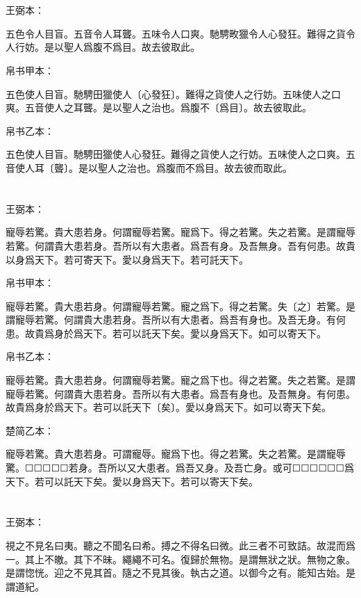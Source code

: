 \documentclass[a5paper]{ctexbook}
\begin{document}
    \chapter{}
    王弼本：

    五色令人目盲。五音令人耳聾。五味令人口爽。馳騁畋獵令人心發狂。難得之貨令人行妨。是以聖人爲腹不爲目。故去彼取此。

    
    帛书甲本：

    五色使人目盲。馳騁田獵使人〔心發狂〕。難得之貨使人之行妨。五味使人之口爽。五音使人之耳聾。是以聖人之治也。爲腹不〔爲目〕。故去彼取此。

    帛书乙本：

    五色使人目盲。馳騁田獵使人心發狂。難得之貨使人之行妨。五味使人之口爽。五音使人耳〔聾〕。是以聖人之治也。爲腹而不爲目。故去彼而取此。

    \chapter{}
    王弼本：

    寵辱若驚。貴大患若身。何謂寵辱若驚。寵爲下。得之若驚。失之若驚。是謂寵辱若驚。何謂貴大患若身。吾所以有大患者。爲吾有身。及吾無身。吾有何患。故貴以身爲天下。若可寄天下。愛以身爲天下。若可託天下。

    
    帛书甲本：

    寵辱若驚。貴大患若身。何謂寵辱若驚。寵之爲下。得之若驚。失〔之〕若驚。是謂寵辱若驚。何謂貴大患若身。吾所以有大患者。爲吾有身也。及吾无身。有何患。故貴爲身於爲天下。若可以託天下矣。愛以身爲天下。如可以寄天下。

    帛书乙本：

    寵辱若驚。貴大患若身。何謂寵辱若驚。寵之爲下也。得之若驚。失之若驚。是謂寵辱若驚。何謂貴大患若身。吾所以有大患者。爲吾有身也。及吾無身。有何患。故貴爲身於爲天下。若可以託天下〔矣〕。愛以身爲天下。如可以寄天下矣。

    楚简乙本：

    寵辱若驚。貴大患若身。可謂寵辱。寵爲下也。得之若驚。失之若驚。是謂寵辱驚。☐☐☐☐☐若身。吾所以又大患者。爲吾又身。及吾亡身。或可☐☐☐☐☐☐爲天下。若可以託天下矣。愛以身爲天下。若可以寄天下矣。

    \chapter{}
    王弼本：

    視之不見名曰夷。聽之不聞名曰希。搏之不得名曰微。此三者不可致詰。故混而爲一。其上不皦。其下不昧。繩繩不可名。復歸於無物。是謂無狀之狀。無物之象。是謂惚恍。迎之不見其首。隨之不見其後。執古之道。以御今之有。能知古始。是謂道紀。
\end{document}
